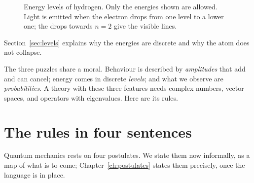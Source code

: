 \begin{figure}[htb]
  \centering
  \caption{Energy levels of hydrogen. Only the energies shown are allowed. Light is emitted when the electron drops from one level to a lower one; the drops towards $n=2$ give the visible lines.}
  \label{fig:levels}
\end{figure}

Section~\ref{sec:levels} explains why the energies are discrete and why the atom does not collapse.

The three puzzles share a moral. Behaviour is described by \emph{amplitudes} that add and can cancel; energy comes in discrete \emph{levels}; and what we observe are \emph{probabilities}. A theory with these three features needs complex numbers, vector spaces, and operators with eigenvalues. Here are its rules.

\section*{The rules in four sentences}

Quantum mechanics rests on four postulates. We state them now informally, as a map of what is to come; Chapter~\ref{ch:postulates} states them precisely, once the language is in place.

